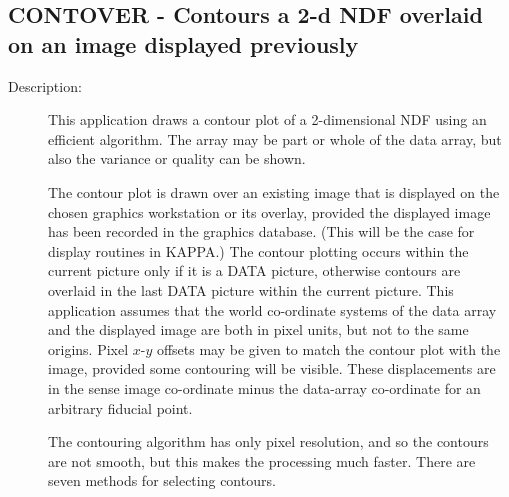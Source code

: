 \documentclass[twoside,11pt]{article}
\newcommand{\stardocinitials}  {SUN}
\newcommand{\stardocnumber}    {239.2}
\newcommand{\stardocname}{\stardocinitials /\stardocnumber}
\newcommand{\xlabel}[1]{}
\newlength{\sstbannerlength}
\newlength{\sstcaptionlength}
\newlength{\sstexampleslength}
\newlength{\sstexampleswidth}
\newcommand{\sstroutine}[3]{
   \goodbreak
   \markboth{{\stardocname}~ --- #1}{{\stardocname}~ --- #1}
   \rule{\textwidth}{0.5mm}
   \vspace{-7ex}
   \newline
   \settowidth{\sstbannerlength}{{\Large {\bf #1}}}
   \setlength{\sstcaptionlength}{\textwidth}
   \setlength{\sstexampleslength}{\textwidth}
   \addtolength{\sstbannerlength}{0.5em}
   \addtolength{\sstcaptionlength}{-2.0\sstbannerlength}
   \addtolength{\sstcaptionlength}{-4.9pt}
   \settowidth{\sstexampleswidth}{{\bf Examples:}}
   \addtolength{\sstexampleslength}{-\sstexampleswidth}
   \parbox[t]{\sstbannerlength}{\flushleft{\Large {\bf #1}}}
   \parbox[t]{\sstcaptionlength}{\center{\Large #2}}
   \parbox[t]{\sstbannerlength}{\flushright{\Large {\bf #1}}}
   \begin{description}
      #3
   \end{description}
}
\newcommand{\sstdescription}[1]{\item[Description:] #1}
\renewcommand{\sstroutine}[3]{
      \subsection{#1\xlabel{#1}-\label{#1}#2}
      \begin{description}
         #3
      \end{description}
   }
\renewcommand{\sstdescription}[1]{\item[Description:]
      \begin{description}
         #1
      \end{description}
   }
\begin{document}
\sstroutine{
   CONTOVER
}{
   Contours a 2-d NDF overlaid on an image displayed previously
}{
   \sstdescription{
      This application draws a contour plot of a 2-dimensional NDF
      using an efficient algorithm.  The array may be part or whole of
      the data array, but also the variance or quality can be shown.

      The contour plot is drawn over an existing image that is
      displayed on the chosen graphics workstation or its overlay,
      provided the displayed image has been recorded in the
      graphics database.  (This will be the case for display routines
      in KAPPA.)  The contour plotting occurs within the current picture
      only if it is a DATA picture, otherwise contours are overlaid in
      the last DATA picture within the current picture.  This
      application assumes that the world co-ordinate systems of the data
      array and the displayed image are both in pixel units, but not to
      the same origins.  Pixel $x$-$y$ offsets may be given to match the
      contour plot with the image, provided some contouring will be
      visible.  These displacements are in the sense image co-ordinate
      minus the data-array co-ordinate for an arbitrary fiducial point.

      The contouring algorithm has only pixel resolution, and
      so the contours are not smooth, but this makes the processing
      much faster.  There are seven methods for selecting contours.

}}
\end{document}
